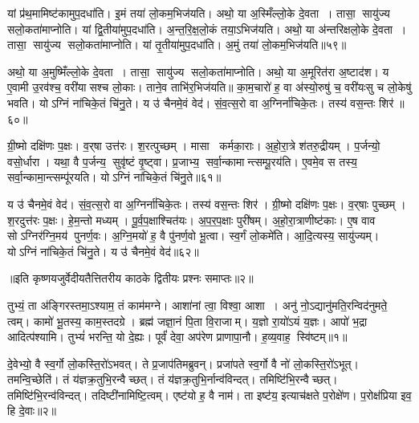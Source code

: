    यां प्र॑थ॒मामिष्ट॑कामुप॒दधा॑ति।
   इ॒मं तया॑ लो॒कम॒भिज॑यति।
   अथो॒ या अ॒स्मिँल्लो॒के दे॒वता।
   तासा॒ सायु॑ज्य सलो॒कता॑माप्नोति।
   यां द्वि॒तीया॑मुप॒दधा॑ति।
   अ॒न्त॒रि॒क्ष॒लो॒कं तया॒ऽभिज॑यति।
   अथो॒ या अ॑न्तरिक्षलो॒के दे॒वता।
   तासा॒ सायु॑ज्य सलो॒कता॑माप्नोति।
   यां तृ॒तीया॑मुप॒दधा॑ति।
   अ॒मुं तया॑ लो॒कम॒भिज॑यति॥५९॥

   अथो॒ या अ॒मुष्मिँल्लो॒के दे॒वता।
   तासा॒ सायु॑ज्य सलो॒कता॑मा\-प्नोति।
   अथो॒ या अ॒मूरित॑रा अ॒ष्टाद॑श।
   य ए॒वामी उ॒रव॑श्च॒ वरी॑यासश्च लो॒काः।
   ताने॒व ताभि॑र॒भिज॑यति॥
   का॒म॒चारो॑ ह॒ वा अ॑स्यो॒रुषु॑ च॒ वरी॑यःसु च लो॒केषु॑ भवति।
   योऽग्निं ना॑चिके॒तं चि॑नु॒ते।
   य उ॑ चैनमे॒वं वेद॑।
   सं॒व॒त्स॒रो वा अ॒ग्निर्ना॑चिके॒तः।
   तस्य॑ वस॒न्तः शिर॑॥६०॥

   ग्री॒ष्मो दक्षि॑णः प॒क्षः।
   व॒र्{‌}षा उत्त॑रः।
   श॒रत्पुच्छम्।
   मासा कर्मका॒राः।
   अ॒हो॒रा॒त्रे श॑तरु॒द्रीयम्।
   प॒र्जन्यो॒ वसो॒र्धारा।
   यथा॒ वै प॒र्जन्य॒ सुवृ॑ष्टं वृ॒ष्ट्वा।
   प्र॒जाभ्य॒ सर्वा॒न्कामान्त्सम्पू॒रय॑ति।
   ए॒वमे॒व स तस्य॒ सर्वा॒न्कामा॒न्त्सम्पू॑रयति।
   योऽग्निं ना॑चिके॒तं चि॑नु॒ते॥६१॥

   य उ॑ चैनमे॒वं वेद॑।
   सं॒व॒त्स॒रो वा अ॒ग्निर्ना॑चिके॒तः।
   तस्य॑ वस॒न्तः शिर॑।
   ग्री॒ष्मो दक्षि॑णः प॒क्षः।
   व॒र्{‌}षाः पुच्छम्।
   श॒रदुत्त॑रः प॒क्षः।
   हे॒म॒न्तो मध्यम्।
   पू॒र्व॒प॒क्षाश्चित॑यः।
   अ॒प॒र॒प॒क्षाः पुरी॑षम्।
   अ॒हो॒रा॒त्राणीष्ट॑काः।
   ए॒ष वाव सोऽग्निर॑ग्नि॒मय॑ पुनर्ण॒वः।
   अ॒ग्नि॒मयो॑ ह॒ वै पु॑नर्ण॒वो भू॒त्वा।
   स्व॒र्गं लो॒कमे॑ति।
   आ॒दि॒त्यस्य॒ सायु॑ज्यम्।
   योऽग्निं ना॑चिके॒तं चि॑नु॒ते।
   य उ॑ चैनमे॒वं वेद॑॥६२॥
\anuvakamend

  ॥इति कृष्णयजुर्वेदीयतैत्तितरीय काठके द्वितीयः प्रश्नः समाप्तः॥२॥


\setcounter{anuvakam}{0}

   तुभ्यं॒ ता अ॑ङ्गिरस्तमा॒ऽश्याम॒ तं काम॑मग्ने।
   आशा॑नां त्वा॒ विश्वा॒ आशा।
   अनु॑ नो॒ऽद्यानु॑मति॒रन्विद॑नुमते॒ त्वम्।
   कामो॑ भू॒तस्य॒ काम॒स्तदग्रे।
   ब्रह्म॑ जज्ञा॒नं पि॒ता वि॒राजाम्।
   य॒ज्ञो रा॒यो॑ऽयं य॒ज्ञः।
   आपो॑ भ॒द्रा आदित्प॑श्यामि।
   तुभ्यं॑ भरन्ति॒ यो दे॒ह्यः।
   पूर्वं॑ देवा॒ अप॑रेण प्राणापा॒नौ।
   ह॒व्य॒वाह॒ स्वि॑ष्टम्॥१॥\anuvakamend
  

   दे॒वेभ्यो॒ वै स्व॒र्गो लो॒कस्ति॒रो॑ऽभवत्।
   ते प्र॒जाप॑तिमब्रुवन्।
   प्रजा॑पते स्व॒र्गो वै नो॑ लो॒कस्ति॒रो॑ऽभूत्।
   तमन्वि॒च्छेति॑।
   तं य॑ज्ञक्र॒तुभि॒रन्वैच्छत्।
   तं य॑ज्ञक्र॒तुभि॒र्नान्व॑विन्दत्।
   तमिष्टि॑भि॒रन्वैच्छत्।
   तमिष्टि॑भि॒रन्व॑विन्दत्।
   तदिष्टी॑नामिष्टि॒\-त्वम्।
   एष्ट॑यो ह॒ वै नाम॑।
   ता इष्ट॑य॒ इत्याच॑क्षते प॒रोक्षे॑ण।
   प॒रोक्ष॑प्रिया इव॒ हि दे॒वाः॥२॥

